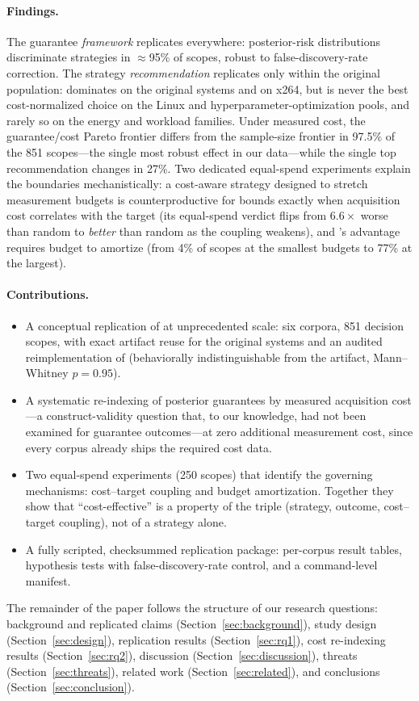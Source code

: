 \paragraph{Findings.} The guarantee \emph{framework} replicates
everywhere: posterior-risk distributions discriminate strategies in
$\approx$95\% of scopes, robust to false-discovery-rate correction. The
strategy \emph{recommendation} replicates only within the original
population: \srs{} dominates on the original systems and on x264, but is
never the best cost-normalized choice on the Linux and
hyperparameter-optimization pools, and rarely so on the energy and
workload families. Under measured cost, the guarantee/cost Pareto
frontier differs from the sample-size frontier in 97.5\% of the 851
scopes---the single most robust effect in our data---while the single top
recommendation changes in 27\%. Two dedicated equal-spend experiments
explain the boundaries mechanistically: a cost-aware strategy designed to
stretch measurement budgets is counterproductive for bounds exactly when
acquisition cost correlates with the target (its equal-spend verdict
flips from $6.6\times$ worse than random to \emph{better} than random as
the coupling weakens), and \srs's advantage requires budget to amortize
(from 4\% of scopes at the smallest budgets to 77\% at the largest).

\paragraph{Contributions.}
\begin{itemize}
\item A conceptual replication of \citet{weis2026risk} at unprecedented
  scale: six corpora, 851 decision scopes, with exact artifact reuse for
  the original systems and an audited reimplementation of \srs{}
  (behaviorally indistinguishable from the artifact, Mann--Whitney
  $p=0.95$).
\item A systematic re-indexing of posterior guarantees by measured
  acquisition cost---a construct-validity question that, to our
  knowledge, had not been examined for guarantee outcomes---at zero
  additional measurement cost, since every corpus already ships the
  required cost data.
\item Two equal-spend experiments (250 scopes) that identify the
  governing mechanisms: cost--target coupling and budget amortization.
  Together they show that ``cost-effective'' is a property of the triple
  (strategy, outcome, cost--target coupling), not of a strategy alone.
\item A fully scripted, checksummed replication package: per-corpus
  result tables, hypothesis tests with false-discovery-rate control, and
  a command-level manifest.
\end{itemize}

The remainder of the paper follows the structure of our research
questions: background and replicated claims
(Section~\ref{sec:background}), study design (Section~\ref{sec:design}),
replication results (Section~\ref{sec:rq1}), cost re-indexing results
(Section~\ref{sec:rq2}), discussion (Section~\ref{sec:discussion}),
threats (Section~\ref{sec:threats}), related work
(Section~\ref{sec:related}), and conclusions
(Section~\ref{sec:conclusion}).

